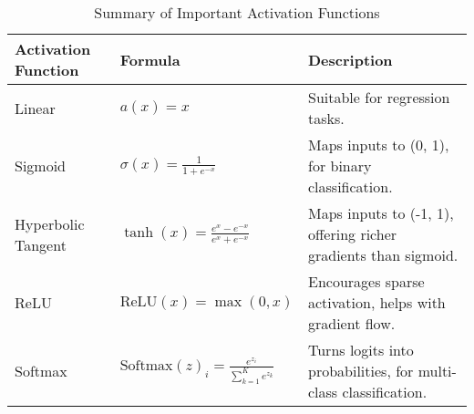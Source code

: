 \begin{table}[htb!]
\caption{Summary of Important Activation Functions}
\label{Tables:ActivationFunctions}
\centering
\footnotesize
\begin{tabularx}{\textwidth}{@{}lXl@{}}
\toprule
\textbf{Activation Function} & \textbf{Formula} & \textbf{Description} \\
\midrule
Linear & \( a(x) = x \) & Suitable for regression tasks. \\
\addlinespace
Sigmoid & \( \sigma(x) = \frac{1}{1 + e^{-x}} \) & Maps inputs to (0, 1), for binary classification. \\
\addlinespace
Hyperbolic Tangent & \( \tanh(x) = \frac{e^{x} - e^{-x}}{e^{x} + e^{-x}} \) & Maps inputs to (-1, 1), offering richer gradients than sigmoid. \\
\addlinespace
ReLU & \( \text{ReLU}(x) = \max(0, x) \) & Encourages sparse activation, helps with gradient flow. \\
\addlinespace
Softmax & \( \text{Softmax}(z)_i = \frac{e^{z_i}}{\sum_{k=1}^K e^{z_k}} \) & Turns logits into probabilities, for multi-class classification. \\
\bottomrule
\end{tabularx}
\end{table}
